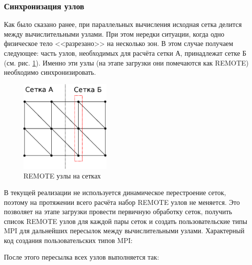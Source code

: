 \subsubsection{Синхронизация узлов}
Как было сказано ранее, при параллельных вычисления исходная сетка делится между вычислительными узлами. При этом нередки ситуации, когда одно физическое тело <<разрезано>> на несколько зон. В этом случае получаем следующее: часть узлов, необходимых для расчёта сетки А, принадлежат сетке Б (см. рис. \ref{pic:remote_nodes}). Именно эти узлы (на этапе загрузки они помечаются как REMOTE) необходимо синхронизировать.
\begin{figure}[htp]
\centering
\includegraphics[width=0.4\textwidth]{eps/remote_nodes.eps}
\caption{REMOTE узлы на сетках}
\label{pic:remote_nodes}
\end{figure}
В текущей реализации не используется динамическое перестроение сеток, поэтому на протяжении всего расчёта набор REMOTE узлов не меняется. Это позволяет на этапе загрузки провести первичную обработку сеток, получить список REMOTE узлов для каждой пары сеток и создать пользовательские типы MPI для дальнейших пересылок между вычислительными узлами. Характерный код создания пользовательских типов MPI:

После этого пересылка всех узлов выполняется так:

